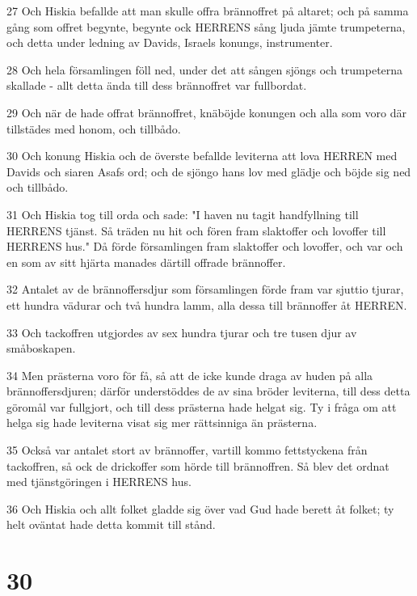 \par 27 Och Hiskia befallde att man skulle offra brännoffret på altaret; och på samma gång som offret begynte, begynte ock HERRENS sång ljuda jämte trumpeterna, och detta under ledning av Davids, Israels konungs, instrumenter.
\par 28 Och hela församlingen föll ned, under det att sången sjöngs och trumpeterna skallade - allt detta ända till dess brännoffret var fullbordat.
\par 29 Och när de hade offrat brännoffret, knäböjde konungen och alla som voro där tillstädes med honom, och tillbådo.
\par 30 Och konung Hiskia och de överste befallde leviterna att lova HERREN med Davids och siaren Asafs ord; och de sjöngo hans lov med glädje och böjde sig ned och tillbådo.
\par 31 Och Hiskia tog till orda och sade: "I haven nu tagit handfyllning till HERRENS tjänst. Så träden nu hit och fören fram slaktoffer och lovoffer till HERRENS hus." Då förde församlingen fram slaktoffer och lovoffer, och var och en som av sitt hjärta manades därtill offrade brännoffer.
\par 32 Antalet av de brännoffersdjur som församlingen förde fram var sjuttio tjurar, ett hundra vädurar och två hundra lamm, alla dessa till brännoffer åt HERREN.
\par 33 Och tackoffren utgjordes av sex hundra tjurar och tre tusen djur av småboskapen.
\par 34 Men prästerna voro för få, så att de icke kunde draga av huden på alla brännoffersdjuren; därför understöddes de av sina bröder leviterna, till dess detta göromål var fullgjort, och till dess prästerna hade helgat sig. Ty i fråga om att helga sig hade leviterna visat sig mer rättsinniga än prästerna.
\par 35 Också var antalet stort av brännoffer, vartill kommo fettstyckena från tackoffren, så ock de drickoffer som hörde till brännoffren. Så blev det ordnat med tjänstgöringen i HERRENS hus.
\par 36 Och Hiskia och allt folket gladde sig över vad Gud hade berett åt folket; ty helt oväntat hade detta kommit till stånd.

\chapter{30}

